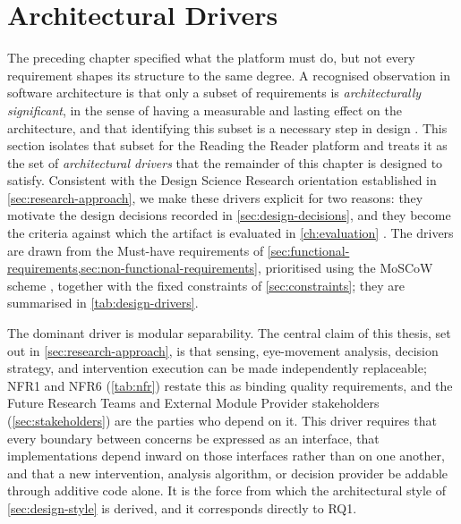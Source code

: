\section{Architectural Drivers}
\label{sec:design-drivers}

The preceding chapter specified what the platform must do, but not every requirement shapes its structure to the same degree.
A recognised observation in software architecture is that only a subset of requirements is \emph{architecturally significant}, in the sense of having a measurable and lasting effect on the architecture, and that identifying this subset is a necessary step in design \cite{chen2013asr}.
This section isolates that subset for the Reading the Reader platform and treats it as the set of \emph{architectural drivers} that the remainder of this chapter is designed to satisfy.
Consistent with the Design Science Research orientation established in \cref{sec:research-approach}, we make these drivers explicit for two reasons: they motivate the design decisions recorded in \cref{sec:design-decisions}, and they become the criteria against which the artifact is evaluated in \cref{ch:evaluation} \cite{hevner2004designscience}.
The drivers are drawn from the Must-have requirements of \cref{sec:functional-requirements,sec:non-functional-requirements}, prioritised using the MoSCoW scheme \cite{clegg1994moscow}, together with the fixed constraints of \cref{sec:constraints}; they are summarised in \cref{tab:design-drivers}.

The dominant driver is modular separability.
The central claim of this thesis, set out in \cref{sec:research-approach}, is that sensing, eye-movement analysis, decision strategy, and intervention execution can be made independently replaceable; NFR1 and NFR6 (\cref{tab:nfr}) restate this as binding quality requirements, and the Future Research Teams and External Module Provider stakeholders (\cref{sec:stakeholders}) are the parties who depend on it.
This driver requires that every boundary between concerns be expressed as an interface, that implementations depend inward on those interfaces rather than on one another, and that a new intervention, analysis algorithm, or decision provider be addable through additive code alone.
It is the force from which the architectural style of \cref{sec:design-style} is derived, and it corresponds directly to RQ1.

